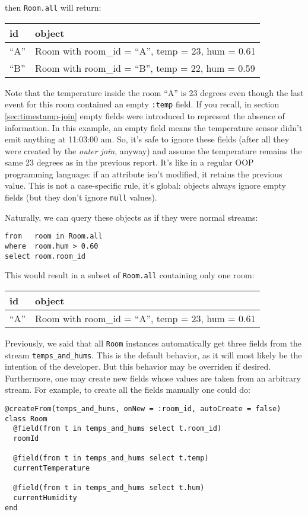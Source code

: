 \documentclass{report}
\begin{document}
then \verb=Room.all= will return:

\begin{tabular}{ |l|l| }
  \hline
  id & object \\
  \hline
  ``A'' & Room with room\_id = ``A'', temp = 23, hum = 0.61 \\
  ``B'' & Room with room\_id = ``B'', temp = 22, hum = 0.59 \\
  \hline
\end{tabular}

Note that the temperature inside the room ``A'' is 23 degrees even
though the last event for this room contained an empty \verb=:temp=
field. If you recall, in section \ref{sec:timestamp-join} empty fields
were introduced to represent the absence of information. In this
example, an empty field means the temperature sensor didn't emit
anything at 11:03:00 am. So, it's safe to ignore these fields (after
all they were created by the \emph{outer join}, anyway) and assume the
temperature remains the same 23 degrees as in the previous
report. It's like in a regular OOP programming language: if an
attribute isn't modified, it retains the previous value. This is not a
case-specific rule, it's global: objects always ignore empty fields
(but they don't ignore \verb=null= values).

Naturally, we can query these objects as if they were normal streams:

\begin{verbatim}
from   room in Room.all
where  room.hum > 0.60
select room.room_id
\end{verbatim}

This would result in a subset of \verb=Room.all= containing only one
room:

\begin{tabular}{ |l|l| }
  \hline
  id & object \\
  \hline
  ``A'' & Room with room\_id = ``A'', temp = 23, hum = 0.61 \\
  \hline
\end{tabular}

Previously, we said that all \verb=Room= instances automatically get
three fields from the stream \verb=temps_and_hums=. This is the
default behavior, as it will most likely be the intention of the
developer. But this behavior may be overriden if desired. Furthermore,
one may create new fields whose values are taken from an arbitrary
stream. For example, to create all the fields manually one could do:

\begin{verbatim}
@createFrom(temps_and_hums, onNew = :room_id, autoCreate = false)
class Room
  @field(from t in temps_and_hums select t.room_id)
  roomId

  @field(from t in temps_and_hums select t.temp)
  currentTemperature

  @field(from t in temps_and_hums select t.hum)
  currentHumidity
end
\end{verbatim}
\end{document}
